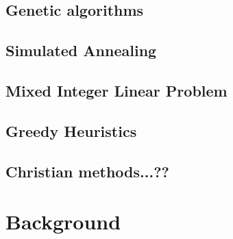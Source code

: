 \documentclass[12pt]{article}
\theoremstyle{definition}
\begin{document}
\subsection{Genetic algorithms}
\subsection{Simulated Annealing}
\subsection{Mixed Integer Linear Problem}
\subsection{Greedy Heuristics}
\subsection{Christian methods...??}
\section{Background}
\end{document}
